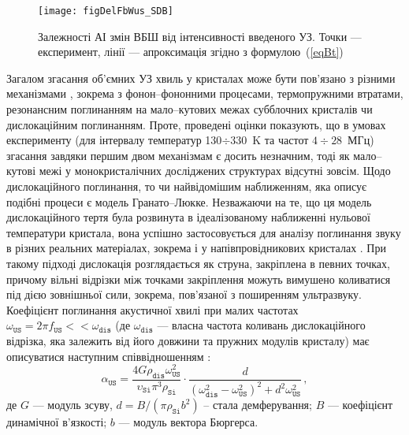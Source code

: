 \begin{figure}
\center
\texttt{[image: figDelFbWus\_SDB]}
\caption{\label{figDelFbWus_SDB}
Залежності АІ змін ВБШ від інтенсивності введеного УЗ.
Точки --- експеримент,
лінії --- апроксимація згідно з формулою~(\ref{eqBt})
}%
\end{figure}

Загалом згасання об'ємних УЗ хвиль у кристалах може бути пов'язано з різними механізмами \cite{True},
зокрема з фонон--фононними процесами,
термопружними втратами, резонансним поглинанням на мало--кутових межах субблочних кристалів чи дислокаційним поглинанням.
Проте, проведені оцінки показують, що в умовах експерименту (для інтервалу температур 130$\div$330~K та частот $4\div28$~МГц) згасання завдяки першим двом механізмам
є досить незначним, тоді як мало--кутові межі у монокристалічних досліджених структурах відсутні зовсім.
Щодо дислокаційного поглинання, то чи найвідомішим наближенням, яка описує подібні процеси є модель Гранато--Люкке.
Незважаючи на те, що ця модель дислокаційного тертя була розвинута в ідеалізованому наближенні нульової температури кристала, вона успішно застосовується для аналізу
 поглинання звуку в різних реальних матеріалах, зокрема і у напівпровідникових кристалах \cite{OstrKorBook,Nik}.
При такому підході дислокація розглядається як струна, закріплена в певних точках, причому вільні відрізки між точками закріплення можуть вимушено коливатися під дією зовнішньої сили, зокрема, пов'язаної з поширенням ультразвуку.
 Коефіцієнт поглинання акустичної хвилі при малих частотах $\omega_\mathtt{US}=2\pi f_\mathtt{US}<<\omega_\mathtt{dis}$
(де $\omega_\mathtt{dis}$ --- власна частота коливань дислокаційного відрізка, яка залежить від його довжини та пружних модулів кристалу)
 має описуватися наступним співвідношенням \cite{Granato,True}:
\begin{equation}
\label{eqAlphsGL}
\alpha_\mathtt{US}=\frac{4G\rho_\mathtt{dis}\omega_\mathtt{US}^2}{\upsilon_\mathtt{Si}\pi^3\rho_\mathtt{Si}}\cdot
    \frac{d}{(\omega_\mathtt{dis}^2-\omega_\mathtt{US}^2)^2+d^2\omega_\mathtt{US}^2}\,,
\end{equation}
де $G$ --- модуль зсуву,
$d = B/(\pi\rho_\mathtt{Si} b^2)$ -- стала демферування;
$B$ --- коефіцієнт динамічної в'язкості;
$b$ --- модуль вектора Бюргерса.

